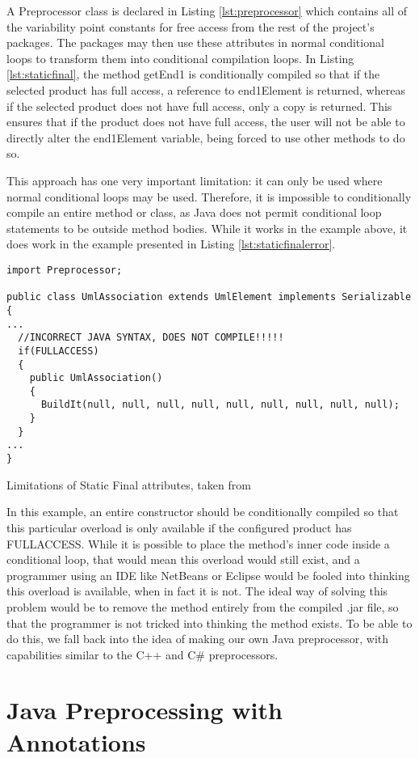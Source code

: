 A Preprocessor class is declared in Listing \ref{lst:preprocessor} which contains all of the variability point constants for free access from the rest of the project's packages. The packages may then use these attributes in normal conditional loops to transform them into conditional compilation loops. In Listing \ref{lst:staticfinal}, the method getEnd1 is conditionally compiled so that if the selected product has full access, a reference to end1Element is returned, whereas if the selected product does not have full access, only a copy is returned. This ensures that if the product does not have full access, the user will not be able to directly alter the end1Element variable, being forced to use other methods to do so.

This approach has one very important limitation: it can only be used where normal conditional loops may be used. Therefore, it is impossible to conditionally compile an entire method or class, as Java does not permit conditional loop statements to be outside method bodies. While it works in the example above, it does work in the example presented in Listing \ref{lst:staticfinalerror}.

\begin{listing}
\begin{verbatim}
import Preprocessor;

public class UmlAssociation extends UmlElement implements Serializable
{
...
  //INCORRECT JAVA SYNTAX, DOES NOT COMPILE!!!!!
  if(FULLACCESS)
  {
    public UmlAssociation()
    {
      BuildIt(null, null, null, null, null, null, null, null, null);
    }
  }
...
}
\end{verbatim}
\caption{Limitations of Static Final attributes, taken from \cite{AUTOREST}} \label{lst:staticfinal}
\end{listing}

In this example, an entire constructor should be conditionally compiled so that this particular overload is only available if the configured product has FULLACCESS. While it is possible to place the method's inner code inside a conditional loop, that would mean this overload would still exist, and a programmer using an IDE like NetBeans or Eclipse would be fooled into thinking this overload is available, when in fact it is not. The ideal way of solving this problem would be to remove the method entirely from the compiled .jar file, so that the programmer is not tricked into thinking the method exists. To be able to do this, we fall back into the idea of making our own Java preprocessor, with capabilities similar to the C++ and C\# preprocessors.


\section{Java Preprocessing with Annotations}
